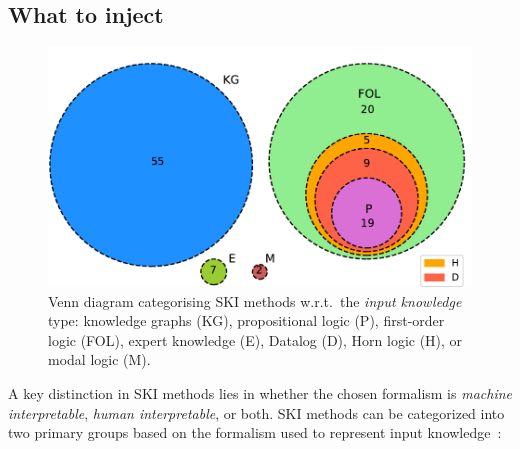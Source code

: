 \subsection{What to inject}\label{subsec:what-to-inject}
%
\begin{figure}
    \centering
    \includegraphics[width=.6\linewidth]{figures/ski-logic}
    \caption[Venn diagram categorising SKI methods w.r.t. the input knowledge]{
        Venn diagram categorising SKI methods w.r.t.\ the \emph{input knowledge} type: knowledge graphs (KG), propositional logic (P), first-order logic (FOL), expert knowledge (E), Datalog (D), Horn logic (H), or modal logic (M).
    }
    \label{fig:pie-ski-logic}
\end{figure}
%
A key distinction in \gls{SKI} methods lies in whether the chosen formalism is \emph{machine interpretable}, \emph{human interpretable}, or both.
%
\Gls{SKI} methods can be categorized into two primary groups based on the formalism used to represent input knowledge~\cite{DBLP:journals/csur/CiattoSAMO24}:
%
